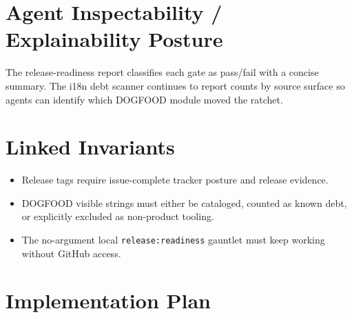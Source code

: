 \section{Agent Inspectability / Explainability Posture}\label{record-214-agent-inspectability-explainability-posture}

The release-readiness report classifies each gate as pass/fail with a concise summary. The i18n debt scanner continues to report counts by source surface so agents can identify which DOGFOOD module moved the ratchet.

\section{Linked Invariants}\label{record-214-linked-invariants}

\begin{itemize}
\tightlist
\item
  Release tags require issue-complete tracker posture and release evidence.
\item
  DOGFOOD visible strings must either be cataloged, counted as known debt, or explicitly excluded as non-product tooling.
\item
  The no-argument local \texttt{r\allowbreak{}e\allowbreak{}l\allowbreak{}e\allowbreak{}a\allowbreak{}s\allowbreak{}e\allowbreak{}:\allowbreak{}r\allowbreak{}e\allowbreak{}a\allowbreak{}d\allowbreak{}i\allowbreak{}n\allowbreak{}e\allowbreak{}s\allowbreak{}s} gauntlet must keep working without GitHub access.
\end{itemize}

\section{Implementation Plan}\label{record-214-implementation-plan}

